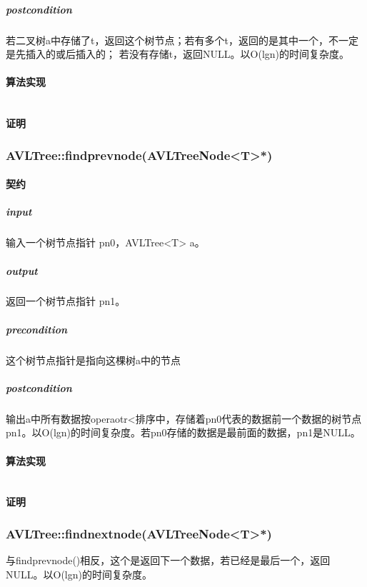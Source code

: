 \documentclass[a4paper]{book}
\numberwithin{equation}{chapter}
\theoremstyle{definition}
\begin{document}
\subparagraph{postcondition}
若二叉树a中存储了t，返回这个树节点；若有多个t，返回的是其中一个，不一定是先插入的或后插入的；
若没有存储t，返回NULL。以O(lgn)的时间复杂度。
\paragraph{算法实现}
\begin{lstlisting}
\end{lstlisting}
\paragraph{证明}
\subsubsection{AVLTree::findprevnode(AVLTreeNode<T>*)}
\paragraph{契约}
\subparagraph{input}
输入一个树节点指针 pn0，AVLTree<T> a。
\subparagraph{output}
返回一个树节点指针 pn1。
\subparagraph{precondition}
这个树节点指针是指向这棵树a中的节点
\subparagraph{postcondition}
输出a中所有数据按operaotr<排序中，存储着pn0代表的数据前一个数据的树节点pn1。以O(lgn)的时间复杂度。若pn0存储的数据是最前面的数据，pn1是NULL。
\paragraph{算法实现}
\begin{lstlisting}
\end{lstlisting}
\paragraph{证明}

\subsubsection{AVLTree::findnextnode(AVLTreeNode<T>*)}
与findprevnode()相反，这个是返回下一个数据，若已经是最后一个，返回NULL。以O(lgn)的时间复杂度。
%
%
%
%
\end{document}
